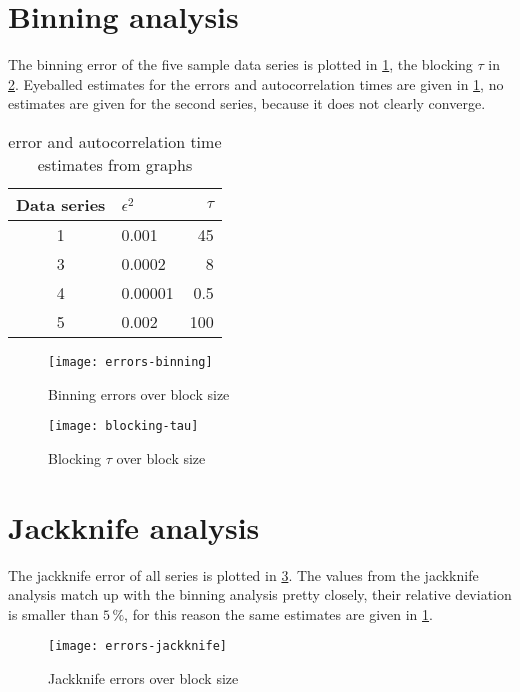 \documentclass[a4paper,11pt,bibtotoc]{scrartcl}
\begin{document}
\section{Binning analysis}

The binning error of the five sample data series is plotted in
\cref{fig:error-binning}, the blocking $\tau$ in \cref{fig:blocking-tau}.
Eyeballed estimates for the errors and autocorrelation times are given in
\cref{tab:eyeball}, no estimates are given for the second series, because it
does not clearly converge.

\begin{table}
    \centering
    \caption{error and autocorrelation time estimates from graphs}
    \label{tab:eyeball}
    \begin{tabular}{clr}
        \toprule
        Data series & $\epsilon^2$ & $\tau$ \\
        \midrule
        1 & 0.001 & 45 \\
        3 & 0.0002 & 8  \\
        4 & 0.00001 & 0.5 \\
        5 & 0.002 & 100 \\
        \bottomrule
    \end{tabular}
\end{table}

\begin{figure}[htb]
    \centering
    \texttt{[image: errors-binning]}
    \caption{Binning errors over block size}
    \label{fig:error-binning}
\end{figure}

\begin{figure}[htb]
    \centering
    \texttt{[image: blocking-tau]}
    \caption{Blocking $\tau$ over block size}
    \label{fig:blocking-tau}
\end{figure}

\section{Jackknife analysis}

The jackknife error of all series is plotted in \cref{fig:error-jackknife}. The
values from the jackknife analysis match up with the binning analysis pretty
closely, their relative deviation is smaller than $5\,\%$, for this reason the
same estimates are given in \cref{tab:eyeball}.

\begin{figure}[htb]
    \centering
    \texttt{[image: errors-jackknife]}
    \caption{Jackknife errors over block size}
    \label{fig:error-jackknife}
\end{figure}
\end{document}
